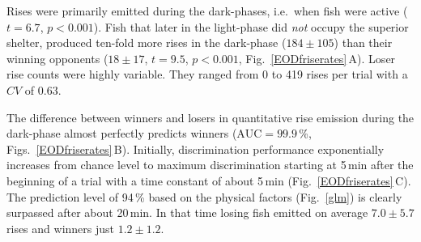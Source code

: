 \documentclass[vruler,JEB]{COB}%
\newcommand{\figitem}[1]{\textsf{\bfseries\uppercase{#1}}\penalty10000 }
\newcommand{\panel}[1]{\textsf{#1}}
\newcommand{\fref}[1]{\textup{\ref{#1}}}
\newcommand{\subfref}[2]{\textup{\ref{#1}}\,\panel{#2}}
\newcommand{\Figb}{Fig.}
\newcommand{\Figsb}{Figs.}
\newcommand{\Figrefb}[1]{\Figb~\fref{#1}}
\newcommand{\Subfigrefb}[2]{\Figb~\subfref{#1}{#2}}
\newcommand{\Subfigsrefb}[2]{\Figsb~\subfref{#1}{#2}}
\begin{document}

Rises were primarily emitted during the dark-phases, i.e.\ when fish were active ($t=6.7$, $p<0.001$). Fish that later in the light-phase did \emph{not} occupy the superior shelter, produced ten-fold more rises in the dark-phase ($184 \pm 105$) than their winning opponents ($18\pm 17$, $t=9.5$, $p<0.001$, \Subfigrefb{EODfriserates}{A}). Loser rise counts were highly variable. They ranged from 0 to 419 rises per trial with a $CV$ of $0.63$. 

The difference between winners and losers in quantitative rise emission during the dark-phase almost perfectly predicts winners ($\text{AUC} = 99.9$\,\%, \Subfigsrefb{EODfriserates}{B}). Initially, discrimination performance exponentially increases from chance level to maximum discrimination starting at 5\,min after the beginning of a trial with a time constant of about 5\,min (\Subfigrefb{EODfriserates}{C}). The prediction level of 94\,\% based on the physical factors (\Figrefb{glm}) is clearly surpassed after about 20\,min. In that time losing fish emitted on average $7.0 \pm 5.7$ rises and winners just $1.2 \pm 1.2$.
\end{document}
